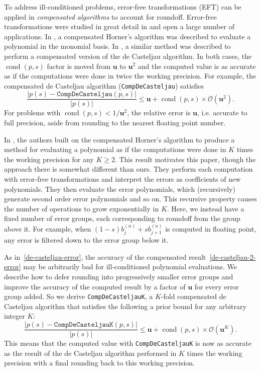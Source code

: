 \documentclass[letterpaper,10pt]{article}
\theoremstyle{definition}
\newcommand{\cond}[1]{\operatorname{cond}\left(#1\right)}
\newcommand{\mach}{\mathbf{u}}
\begin{document}
To address ill-conditioned problems, error-free transformations (EFT) can
be applied in \textit{compensated algorithms} to account for roundoff.
Error-free transformations were studied in great detail in \cite{Ogita2005}
and open a large number of applications.
In \cite{langlois_et_al:DSP:2006:442}, a compensated Horner's algorithm was
described to evaluate a polynomial in the monomial basis. In \cite{Jiang2010},
a similar method was described to perform a compensated version of the de
Casteljau algorithm. In both cases, the \(\cond{p, s}\) factor is moved
from \(\mach\) to \(\mach^2\) and the computed value is as accurate
as if the computations were done in twice the working precision. For example,
the compensated de Casteljau algorithm (\texttt{CompDeCasteljau}) satisfies
\begin{equation}\label{de-casteljau-2-error}
  \frac{\left|p(s) - \mathtt{CompDeCasteljau}(p, s)\right|}{
    \left|p(s)\right|} \leq \mach + \cond{p, s} \times
    \mathcal{O}\left(\mach^2\right).
\end{equation}
For problems with \(\cond{p, s} < 1 / \mach^2\), the relative error
is \(\mach\), i.e. accurate to full precision, aside from rounding to the
nearest floating point number.

In \cite{Graillat2009}, the authors built on the compensated Horner's
algorithm to produce a method for evaluating a polynomial as if
the computations were done in \(K\) times the working precision for
any \(K \geq 2\). This result motivates this paper, though the
approach there is somewhat different than ours. They perform each computation
with error-free transformations and interpret the errors as coefficients of new
polynomials. They then evaluate the error polynomials, which (recursively)
generate second order error polynomials and so on. This recursive property
causes the number of operations to grow exponentially in \(K\). Here, we
instead have a fixed number of error groups, each corresponding to roundoff
from the group above it. For example, when
\((1 - s) b_j^{(n)} + s b_{j + 1}^{(n)}\) is computed in floating point, any
error is filtered down to the error group below it.

As in~\eqref{de-casteljau-error}, the accuracy of the compensated
result~\eqref{de-casteljau-2-error} may be arbitrarily bad for ill-conditioned
polynomial evaluations. We describe how to defer rounding into progressively
smaller error groups and improve the accuracy of the computed result by a
factor of \(\mach\) for every error group added. So we derive
\texttt{CompDeCasteljauK}, a \(K\)-fold compensated de Casteljau algorithm
that satisfies the following a prior bound for any arbitrary integer \(K\):
\begin{equation}
  \frac{\left|p(s) - \mathtt{CompDeCasteljauK}(p, s)\right|}{
    \left|p(s)\right|} \leq \mach + \cond{p, s} \times
    \mathcal{O}\left(\mach^K\right).
\end{equation}
This means that the computed value with \texttt{CompDeCasteljauK} is now
as accurate as the result of the de Casteljau algorithm performed in
\(K\) times the working precision with a final rounding back to this
working precision.
\end{document}
